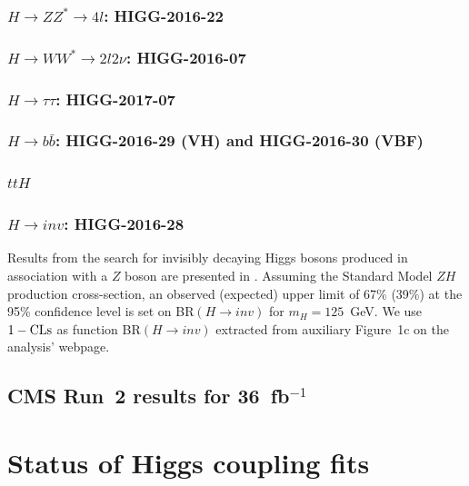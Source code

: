 \documentclass[submission, Phys]{SciPost}
\begin{document}
\subsubsection*{\boldmath $H\to ZZ^*\to 4l$: HIGG-2016-22}


\subsubsection*{\boldmath $H\to WW^*\to 2l2\nu$: HIGG-2016-07}

\subsubsection*{\boldmath $H\to \tau\tau$: HIGG-2017-07}

\subsubsection*{\boldmath $H\to b\bar b$: HIGG-2016-29 (VH) and HIGG-2016-30 (VBF)}

\subsubsection*{\boldmath $ttH$}

\subsubsection*{\boldmath $H\to inv$: HIGG-2016-28}

Results from the search for invisibly decaying Higgs bosons produced in association with a $Z$ boson are presented in \cite{Aaboud:2017bja}. Assuming the Standard Model $ZH$ production cross-section, an observed (expected) upper limit of 67\% (39\%) at the 95\% confidence level is set on BR$(H\to inv)$ for $m_H= 125$~GeV. We use $1-{\rm CLs}$ as function BR$(H\to inv)$ extracted from auxiliary Figure~1c on the analysis' webpage. 


\subsection{CMS Run~2 results for 36~fb$^{-1}$}


\section{Status of Higgs coupling fits}
\end{document}
